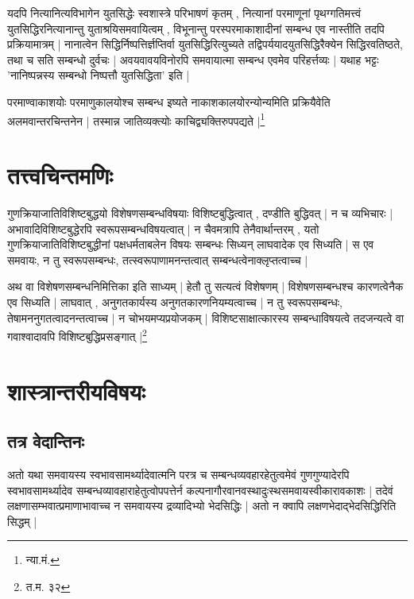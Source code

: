 यदपि नित्यानित्यविभागेन युतसिद्धेः स्वशास्त्रे परिभाषणं कृतम् , नित्यानां परमाणूनां पृथग्गतिमत्त्वं युतसिद्धिरनित्यानान्तु युताश्रयिसमवायित्वम् , विभूनान्तु परस्परमाकाशादीनां सम्बन्ध एव नास्तीति तदपि प्रक्रियामात्रम् | नानात्वेन सिद्धिर्निष्पत्तिर्ज्ञप्तिर्वा युतसिद्धिरित्युच्यते तद्विपर्ययादयुतसिद्धिरैक्येन सिद्धिरवतिष्ठते, तथा च सति सम्बन्धो दुर्वचः | अवयवावयविनोरपि समवायात्मा सम्बन्ध एवमेव परिहर्त्तव्यः | यथाह भट्टः 'नानिष्पन्नस्य सम्बन्धो निष्पत्तौ युतसिद्धिता' इति |

परमाण्वाकाशयोः परमाणुकालयोश्च सम्बन्ध इष्यते नाकाशकालयोरन्योन्यमिति प्रक्रियैवेति अलमवान्तरचिन्तनेन | तस्मान्न जातिव्यक्त्योः काचिद्व्यक्तिरुपपद्यते |\footnote{न्या.मं.}


\section{तत्त्वचिन्तमणिः} गुणक्रियाजातिविशिष्टबुद्धयो विशेषणसम्बन्धविषयाः विशिष्टबुद्धित्वात् , दण्डीति बुद्धिवत् | न च व्यभिचारः | अभावादिविशिष्टबुद्धेरपि स्वरूपसम्बन्धविषयत्वात् | न चैवमत्रापि तेनैवार्थान्तरम् , यतो गुणक्रियाजातिविशिष्टबुद्धीनां पक्षधर्मताबलेन विषयः सम्बन्धः सिध्यन् लाघवादेक एव सिध्यति | स एव समवायः, न तु स्वरूपसम्बन्धः, तत्स्वरूपाणामनन्तत्वात् सम्बन्धत्वेनाक्लृप्तत्वाच्च |

अथ वा विशेषणसम्बन्धनिमित्तिका इति साध्यम् | हेतौ तु सत्यत्वं विशेषणम् | विशेषणसम्बन्धश्च कारणत्वेनैक एव सिध्यति | लाघवात् , अनुगतकार्यस्य अनुगतकारणनियम्यत्वाच्च | न तु स्वरूपसम्बन्धः, तेषामननुगतत्वादनन्तत्वाच्च | न चोभयमप्यप्रयोजकम् | विशिष्टसाक्षात्कारस्य सम्बन्धाविषयत्वे तदजन्यत्वे वा गवाश्वादावपि विशिष्टबुद्धिप्रसङ्गात् |\footnote{त.म. ३२}

\section{शास्त्रान्तरीयविषयः} 
\subsection{तत्र वेदान्तिनः} अतो यथा समवायस्य स्वभावसामर्थ्यादेवात्मनि परत्र च सम्बन्धव्यवहारहेतुत्वमेवं गुणगुण्यादेरपि स्वभावसामर्थ्यादेव  सम्बन्धव्यावहाराहेतुत्वोपपत्तेर्न कल्पनागौरवानवस्थादुःस्थसमवायस्वीकारावकाशः | तदेवं लक्षणासम्भवात्प्रमाणाभावाच्च न समवायस्य द्रव्यादिभ्यो भेदसिद्धिः | अतो न क्वापि लक्षणभेदाद्भेदसिद्धिरिति सिद्धम् | 




